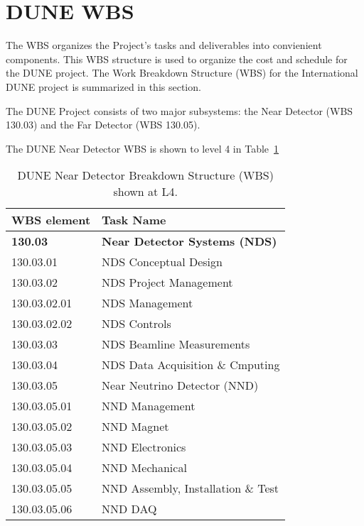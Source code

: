 \section{DUNE WBS}

The WBS organizes the Project's tasks and deliverables into convienient components. 
This WBS structure is used to organize the cost and schedule for the DUNE project.
The Work Breakdown Structure (WBS) for the International DUNE project is summarized
in this section.

The DUNE Project consists of two major subsystems: the Near Detector (WBS 130.03) and
the Far Detector (WBS 130.05).

The DUNE Near Detector WBS is shown to level 4 in Table~\ref{tab:ND_WBS}
\begin{table}[ht!]
\centering
\begin{tabular}{|l||l|} \hline
WBS element & Task Name \\ \hline\hline
{\bf              130.03}  & {\bf Near Detector Systems (NDS)}  \\ \hline
\hspace{1em}130.03.01      & NDS Conceptual Design        \\ \hline
\hspace{1em}130.03.02      & NDS Project Management       \\ \hline
\hspace{2em}130.03.02.01   & NDS Management               \\ \hline
\hspace{2em}130.03.02.02   & NDS Controls                 \\ \hline
\hspace{1em}130.03.03      & NDS Beamline Measurements    \\ \hline
\hspace{1em}130.03.04      & NDS Data Acquisition \& Cmputing    \\ \hline
\hspace{1em}130.03.05      & Near Neutrino Detector (NND) \\ \hline
\hspace{2em}130.03.05.01   & NND Management               \\ \hline
\hspace{2em}130.03.05.02   & NND Magnet                   \\ \hline
\hspace{2em}130.03.05.03   & NND Electronics              \\ \hline
\hspace{2em}130.03.05.04   & NND Mechanical               \\ \hline
\hspace{2em}130.03.05.05   & NND Assembly, Installation \& Test  \\ \hline
\hspace{2em}130.03.05.06   & NND DAQ                      \\ \hline
\end{tabular}
\caption{DUNE Near Detector Breakdown Structure (WBS) shown at L4.}
\label{tab:ND_WBS}
\end{table}
